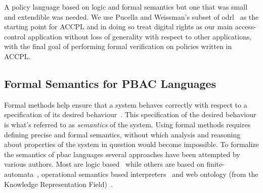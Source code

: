 \documentclass[runningheads,a4paper]{llncs}
\begin{document}
A policy language based on logic and formal semantics but one that was small and extendible was needed. We use Pucella and Weissman's subset of \ac{odrl}~\cite{pucella2006} as the starting point for \ac{ACCPL} and in doing so treat digital rights as our main access-control application without loss of generality with respect to other applications, with the final goal of performing formal verification on policies written in \ac{ACCPL}.



\subsection{Formal Semantics for PBAC Languages}


Formal methods help ensure that a system behaves correctly with respect to a specification of its desired behaviour~\cite{TAPL}. This specification of the desired behaviour is what's referred to as \emph{semantics} of the system. Using formal methods requires defining precise and formal semantics, without which analysis and reasoning about properties of the system in question would become impossible. To formalize the semantics of \ac{pbac} languages several approaches have been attempted by various authors. Most are logic based~\cite{Halpern2008,pucella2006} while others are based on finite-automata~\cite{Holzer}, operational semantics based interpreters~\cite{Safavi-naini} and web ontology (from the Knowledge Representation Field)~\cite{Kasten2010MTS}. 
\end{document}
